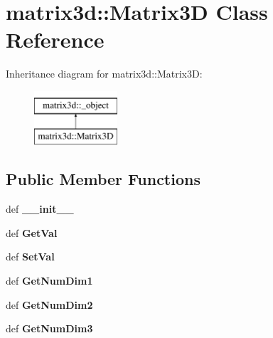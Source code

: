 \hypertarget{classmatrix3d_1_1Matrix3D}{
\section{matrix3d::Matrix3D Class Reference}
\label{d4/dbb/classmatrix3d_1_1Matrix3D}
}
Inheritance diagram for matrix3d::Matrix3D:\begin{figure}[H]
\begin{center}
\leavevmode
\includegraphics[height=2cm]{d4/dbb/classmatrix3d_1_1Matrix3D}
\end{center}
\end{figure}
\subsection*{Public Member Functions}
\begin{DoxyCompactItemize}
\item 
\hypertarget{classmatrix3d_1_1Matrix3D_afc828ef75c2d6fda473bab6673006fc2}{
def {\bfseries \_\-\_\-init\_\-\_\-}}
\label{d4/dbb/classmatrix3d_1_1Matrix3D_afc828ef75c2d6fda473bab6673006fc2}

\item 
\hypertarget{classmatrix3d_1_1Matrix3D_a9647e57d80350d7910056de98e6bfc2a}{
def {\bfseries GetVal}}
\label{d4/dbb/classmatrix3d_1_1Matrix3D_a9647e57d80350d7910056de98e6bfc2a}

\item 
\hypertarget{classmatrix3d_1_1Matrix3D_a1996596a1f5a693c6f8e320aef7b7710}{
def {\bfseries SetVal}}
\label{d4/dbb/classmatrix3d_1_1Matrix3D_a1996596a1f5a693c6f8e320aef7b7710}

\item 
\hypertarget{classmatrix3d_1_1Matrix3D_a6b2c6828d4b23fac9e5d73947cd8fd5c}{
def {\bfseries GetNumDim1}}
\label{d4/dbb/classmatrix3d_1_1Matrix3D_a6b2c6828d4b23fac9e5d73947cd8fd5c}

\item 
\hypertarget{classmatrix3d_1_1Matrix3D_a11ba8f2b438f400343f199d3eb858714}{
def {\bfseries GetNumDim2}}
\label{d4/dbb/classmatrix3d_1_1Matrix3D_a11ba8f2b438f400343f199d3eb858714}

\item 
\hypertarget{classmatrix3d_1_1Matrix3D_a23d415fad6978cae908870e45ebc30cc}{
def {\bfseries GetNumDim3}}
\label{d4/dbb/classmatrix3d_1_1Matrix3D_a23d415fad6978cae908870e45ebc30cc}

\end{DoxyCompactItemize}
